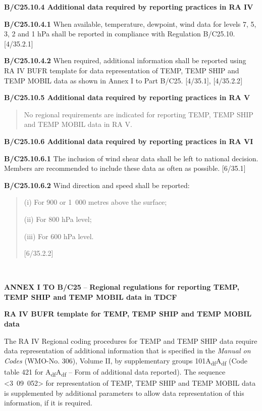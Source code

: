 \textbf{B/C25.10.4 Additional data required by reporting practices in RA IV}

\textbf{B/C25.10.4.1} When available, temperature, dewpoint, wind data for levels 7, 5, 3, 2 and 1 hPa shall be reported in compliance with Regulation B/C25.10. {[}4/35.2.1{]}

\textbf{B/C25.10.4.2} When required, additional information shall be reported using RA IV BUFR template for data representation of TEMP, TEMP SHIP and TEMP MOBIL data as shown in Annex I to Part B/C25. {[}4/35.1{]}, {[}4/35.2.2{]}

\textbf{B/C25.10.5 Additional data required by reporting practices in RA V}

\begin{quote}
No regional requirements are indicated for reporting TEMP, TEMP SHIP and TEMP MOBIL data in RA V.
\end{quote}

\textbf{B/C25.10.6 Additional data required by reporting practices in RA VI}

\textbf{B/C25.10.6.1} The inclusion of wind shear data shall be left to national decision. Members are recommended to include these data as often as possible. {[}6/35.1{]}

\textbf{B/C25.10.6.2} Wind direction and speed shall be reported:

\begin{quote}
(i) For 900 or 1~000 metres above the surface;

(ii) For 800 hPa level;

(iii) For 600 hPa level.

{[}6/35.2.2{]}
\end{quote}

\textbf{\\
}

\textbf{ANNEX I TO B/C25} -- \textbf{Regional regulations for reporting TEMP, TEMP SHIP and TEMP MOBIL data in TDCF}

\textbf{RA IV BUFR template for TEMP, TEMP SHIP and TEMP MOBIL data}

The RA IV Regional coding procedures for TEMP and TEMP SHIP data require data representation of additional information that is specified in the \emph{Manual on Codes} (WMO-No. 306), Volume II, by supplementary groups 101A\textsubscript{df}A\textsubscript{df} (Code table 421 for A\textsubscript{df}A\textsubscript{df} -- Form of additional data reported). The sequence \textless3~09~052\textgreater{} for representation of TEMP, TEMP SHIP and TEMP MOBIL data is supplemented by additional parameters to allow data representation of this information, if it is required.

